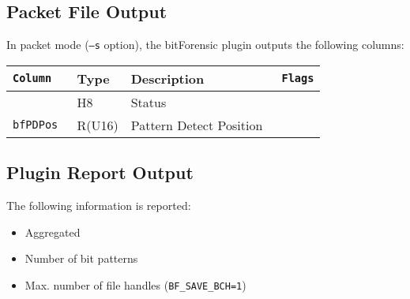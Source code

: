 \documentclass[documentation]{subfiles}
\begin{document}
\subsection{Packet File Output}
In packet mode ({\tt --s} option), the bitForensic plugin outputs the following columns:
\begin{longtable}{>{\tt}lll>{\tt\small}l}
    \toprule
    {\bf Column} & {\bf Type} & {\bf Description} & {\bf Flags}\\
    \midrule\endhead%
    \nameref{bfStat}  & H8     & Status                  & \\
    bfPDPos           & R(U16) & Pattern Detect Position & \\
    \bottomrule
\end{longtable}

\subsection{Plugin Report Output}
The following information is reported:
\begin{itemize}
    \item Aggregated {\tt{}}
    \item Number of bit patterns
    \item Max. number of file handles ({\tt BF\_SAVE\_BCH=1})
\end{itemize}
\end{document}
